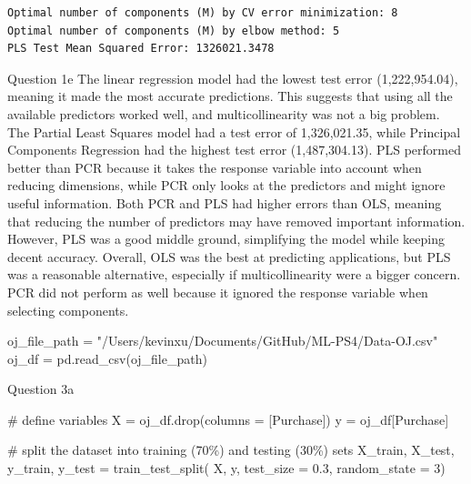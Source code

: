 \documentclass[
  letterpaper,
  DIV=11,
  numbers=noendperiod]{scrartcl}
\newenvironment{Shaded}{\begin{snugshade}}{\end{snugshade}}
\newcommand{\CommentTok}[1]{\textcolor[rgb]{0.37,0.37,0.37}{#1}}
\newcommand{\DecValTok}[1]{\textcolor[rgb]{0.68,0.00,0.00}{#1}}
\newcommand{\FloatTok}[1]{\textcolor[rgb]{0.68,0.00,0.00}{#1}}
\newcommand{\NormalTok}[1]{\textcolor[rgb]{0.00,0.23,0.31}{#1}}
\newcommand{\OperatorTok}[1]{\textcolor[rgb]{0.37,0.37,0.37}{#1}}
\newcommand{\StringTok}[1]{\textcolor[rgb]{0.13,0.47,0.30}{#1}}
\begin{document}
\begin{verbatim}
Optimal number of components (M) by CV error minimization: 8
Optimal number of components (M) by elbow method: 5
PLS Test Mean Squared Error: 1326021.3478
\end{verbatim}

Question 1e The linear regression model had the lowest test error
(1,222,954.04), meaning it made the most accurate predictions. This
suggests that using all the available predictors worked well, and
multicollinearity was not a big problem. The Partial Least Squares model
had a test error of 1,326,021.35, while Principal Components Regression
had the highest test error (1,487,304.13). PLS performed better than PCR
because it takes the response variable into account when reducing
dimensions, while PCR only looks at the predictors and might ignore
useful information. Both PCR and PLS had higher errors than OLS, meaning
that reducing the number of predictors may have removed important
information. However, PLS was a good middle ground, simplifying the
model while keeping decent accuracy. Overall, OLS was the best at
predicting applications, but PLS was a reasonable alternative,
especially if multicollinearity were a bigger concern. PCR did not
perform as well because it ignored the response variable when selecting
components.

\begin{Shaded}
\begin{Highlighting}[]
\NormalTok{oj\_file\_path }\OperatorTok{=} \StringTok{"/Users/kevinxu/Documents/GitHub/ML{-}PS4/Data{-}OJ.csv"}
\NormalTok{oj\_df }\OperatorTok{=}\NormalTok{ pd.read\_csv(oj\_file\_path)}
\end{Highlighting}
\end{Shaded}

Question 3a

\begin{Shaded}
\begin{Highlighting}[]
\CommentTok{\# define variables}
\NormalTok{X }\OperatorTok{=}\NormalTok{ oj\_df.drop(columns }\OperatorTok{=}\NormalTok{ [}\StringTok{\textquotesingle{}Purchase\textquotesingle{}}\NormalTok{])  }
\NormalTok{y }\OperatorTok{=}\NormalTok{ oj\_df[}\StringTok{\textquotesingle{}Purchase\textquotesingle{}}\NormalTok{] }

\CommentTok{\# split the dataset into training (70\%) and testing (30\%) sets}
\NormalTok{X\_train, X\_test, y\_train, y\_test }\OperatorTok{=}\NormalTok{ train\_test\_split(}
\NormalTok{    X, y, test\_size }\OperatorTok{=} \FloatTok{0.3}\NormalTok{, random\_state }\OperatorTok{=} \DecValTok{3}\NormalTok{)}
\end{Highlighting}
\end{Shaded}
\end{document}
